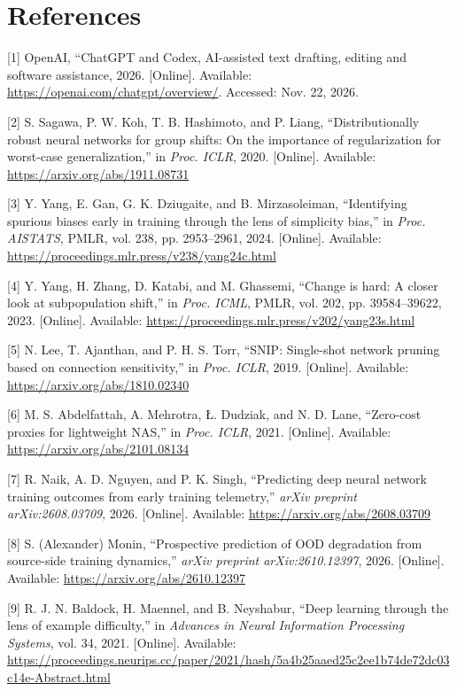 \section*{References}

[1]  OpenAI, ``ChatGPT and Codex, AI-assisted text drafting, editing and software assistance, 2026. [Online]. Available: \url{https://openai.com/chatgpt/overview/}. Accessed: Nov. 22, 2026.

[2]  S. Sagawa, P. W. Koh, T. B. Hashimoto, and P. Liang, ``Distributionally robust neural networks for group shifts: On the importance of regularization for worst-case generalization,'' in \emph{Proc. ICLR}, 2020. [Online]. Available: \url{https://arxiv.org/abs/1911.08731}

[3]  Y. Yang, E. Gan, G. K. Dziugaite, and B. Mirzasoleiman, ``Identifying spurious biases early in training through the lens of simplicity bias,'' in \emph{Proc. AISTATS}, PMLR, vol. 238, pp. 2953--2961, 2024. [Online]. Available: \url{https://proceedings.mlr.press/v238/yang24c.html}

[4]  Y. Yang, H. Zhang, D. Katabi, and M. Ghassemi, ``Change is hard: A closer look at subpopulation shift,'' in \emph{Proc. ICML}, PMLR, vol. 202, pp. 39584--39622, 2023. [Online]. Available: \url{https://proceedings.mlr.press/v202/yang23s.html}

[5]  N. Lee, T. Ajanthan, and P. H. S. Torr, ``SNIP: Single-shot network pruning based on connection sensitivity,'' in \emph{Proc. ICLR}, 2019. [Online]. Available: \url{https://arxiv.org/abs/1810.02340}

[6]  M. S. Abdelfattah, A. Mehrotra, \L{}. Dudziak, and N. D. Lane, ``Zero-cost proxies for lightweight NAS,'' in \emph{Proc. ICLR}, 2021. [Online]. Available: \url{https://arxiv.org/abs/2101.08134}

[7]  R. Naik, A. D. Nguyen, and P. K. Singh, ``Predicting deep neural network training outcomes from early training telemetry,'' \emph{arXiv preprint arXiv:2608.03709}, 2026. [Online]. Available: \url{https://arxiv.org/abs/2608.03709}

[8]  S. (Alexander) Monin, ``Prospective prediction of OOD degradation from source-side training dynamics,'' \emph{arXiv preprint arXiv:2610.12397}, 2026. [Online]. Available: \url{https://arxiv.org/abs/2610.12397}

[9]  R. J. N. Baldock, H. Maennel, and B. Neyshabur, ``Deep learning through the lens of example difficulty,'' in \emph{Advances in Neural Information Processing Systems}, vol. 34, 2021. [Online]. Available: \url{https://proceedings.neurips.cc/paper/2021/hash/5a4b25aaed25c2ee1b74de72dc03c14e-Abstract.html}

